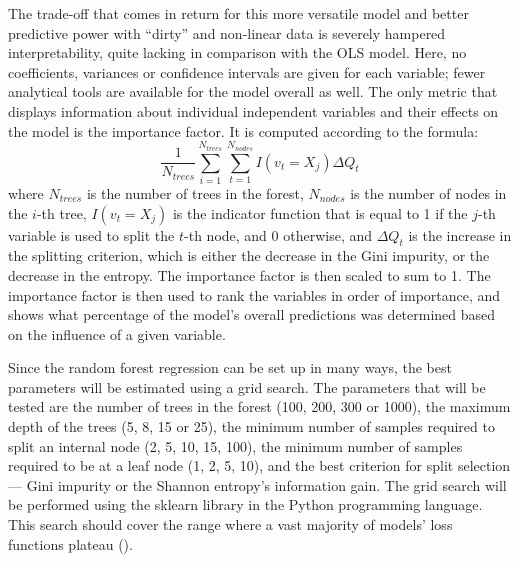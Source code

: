 \documentclass[12pt]{report}
\begin{document}
The trade-off that comes in return for this more versatile model and better predictive power with ``dirty'' and non-linear data is severely hampered interpretability, quite lacking in comparison with the OLS model. Here, no coefficients, variances or confidence intervals are given for each variable; fewer analytical tools are available for the model overall as well. The only metric that displays information about individual independent variables and their effects on the model is the importance factor. It is computed according to the formula:
\begin{equation}
	\frac{1}{N_{trees}} \sum_{i=1}^{N_{trees}} \sum_{t=1}^{N_{nodes}} I(v_{t} = X_j) \Delta Q_{t}
\end{equation}
where $N_{trees}$ is the number of trees in the forest, $N_{nodes}$ is the number of nodes in the $i$-th tree, $I(v_{t} = X_j)$ is the indicator function that is equal to 1 if the $j$-th variable is used to split the $t$-th node, and 0 otherwise, and $\Delta Q_{t}$ is the increase in the splitting criterion, which is either the decrease in the Gini impurity, or the decrease in the entropy. The importance factor is then scaled to sum to 1. The importance factor is then used to rank the variables in order of importance, and shows what percentage of the model's overall predictions was determined based on the influence of a given variable.

Since the random forest regression can be set up in many ways, the best parameters will be estimated using a grid search. The parameters that will be tested are the number of trees in the forest (100, 200, 300 or 1000), the maximum depth of the trees (5, 8, 15 or 25), the minimum number of samples required to split an internal node (2, 5, 10, 15, 100), the minimum number of samples required to be at a leaf node (1, 2, 5, 10), and the best criterion for split selection --- Gini impurity or the Shannon entropy's information gain. The grid search will be performed using the sklearn library in the Python programming language. This search should cover the range where a vast majority of models' loss functions plateau (\cite[p. 354]{neloy2019}).
\end{document}
